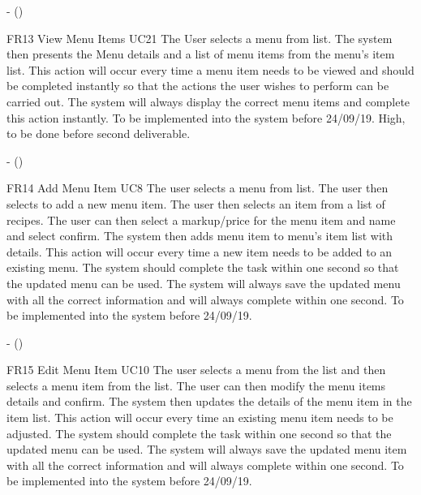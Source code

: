 \noindent \textbf{} -  ()\\
\begin{small}
	
\end{small}
\linebreak

FR13
View Menu Items
UC21
The User selects a menu from list. The system then presents the Menu details and a list of menu items from the menu’s item list. This action will occur every time a menu item needs to be viewed and should be completed instantly so that the actions the user wishes to perform can be carried out. The system will always display the correct menu items and complete this action instantly. To be implemented into the system before 24/09/19.
High, to be done before second deliverable.

\noindent \textbf{} -  ()\\
\begin{small}
	
\end{small}
\linebreak

FR14
Add Menu Item
UC8
The user selects a menu from list. The user then selects to add a new menu item. The user then selects an item from a list of recipes. The user can then select a markup/price for the menu item and name and select confirm. The system then adds menu item to menu’s item list with details. This action will occur every time a new item needs to be added to an existing menu. The system should complete the task within one second so that the updated menu can be used. The system will always save the updated menu with all the correct information and will always complete within one second. To be implemented into the system before 24/09/19.

\noindent \textbf{} -  ()\\
\begin{small}
	
\end{small}
\linebreak

FR15
Edit Menu Item
UC10
The user selects a menu from the list and then selects a menu item from the list. The user can then modify the menu items details and confirm. The system then updates the details of the menu item in the item list. This action will occur every time an existing menu item needs to be adjusted. The system should complete the task within one second so that the updated menu can be used. The system will always save the updated menu item with all the correct information and will always complete within one second. To be implemented into the system before 24/09/19. 

